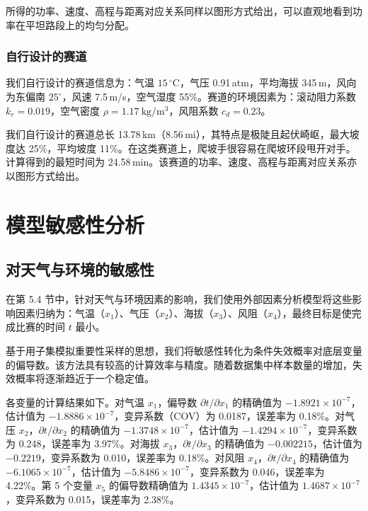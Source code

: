 \documentclass[11pt,a4paper]{ctexart}
\begin{document}
所得的功率、速度、高程与距离对应关系同样以图形方式给出，可以直观地看到功率在平坦路段上的均匀分配。

\subsubsection{自行设计的赛道}

我们自行设计的赛道信息为：气温 $15\,^{\circ}\mathrm{C}$，气压 0.91\,atm，平均海拔 345\,m，风向为东偏南 $25^{\circ}$，风速 7.5\,m/s，空气湿度 55\%。赛道的环境因素为：滚动阻力系数 $k_r=0.019$，空气密度 $\rho=1.17\ \mathrm{kg/m^{3}}$，风阻系数 $c_d=0.23$。

我们自行设计的赛道总长 13.78\,km（8.56\,mi），其特点是极陡且起伏崎岖，最大坡度达 25\%，平均坡度 11\%。在这类赛道上，爬坡手很容易在爬坡环段甩开对手。计算得到的最短时间为 24.58\,min。该赛道的功率、速度、高程与距离对应关系亦以图形方式给出。

\section{模型敏感性分析}

\subsection{对天气与环境的敏感性}

在第 5.4 节中，针对天气与环境因素的影响，我们使用外部因素分析模型将这些影响因素归纳为：气温（$x_1$）、气压（$x_2$）、海拔（$x_3$）、风阻（$x_4$），最终目标是使完成比赛的时间 $t$ 最小。

基于用子集模拟重要性采样的思想，我们将敏感性转化为条件失效概率对底层变量的偏导数。该方法具有较高的计算效率与精度。随着数据集中样本数量的增加，失效概率将逐渐趋近于一个稳定值。

各变量的计算结果如下。对气温 $x_1$，偏导数 $\partial t/\partial x_1$ 的精确值为 $-1.8921\times 10^{-7}$，估计值为 $-1.8886\times 10^{-7}$，变异系数（COV）为 0.0187，误差率为 0.18\%。对气压 $x_2$，$\partial t/\partial x_2$ 的精确值为 $-1.3748\times 10^{-7}$，估计值为 $-1.4294\times 10^{-7}$，变异系数为 0.248，误差率为 3.97\%。对海拔 $x_3$，$\partial t/\partial x_3$ 的精确值为 $-0.002215$，估计值为 $-0.2219$，变异系数为 0.010，误差率为 0.18\%。对风阻 $x_4$，$\partial t/\partial x_4$ 的精确值为 $-6.1065\times 10^{-7}$，估计值为 $-5.8486\times 10^{-7}$，变异系数为 0.046，误差率为 4.22\%。第 5 个变量 $x_5$ 的偏导数精确值为 $1.4345\times 10^{-7}$，估计值为 $1.4687\times 10^{-7}$，变异系数为 0.015，误差率为 2.38\%。
\end{document}
